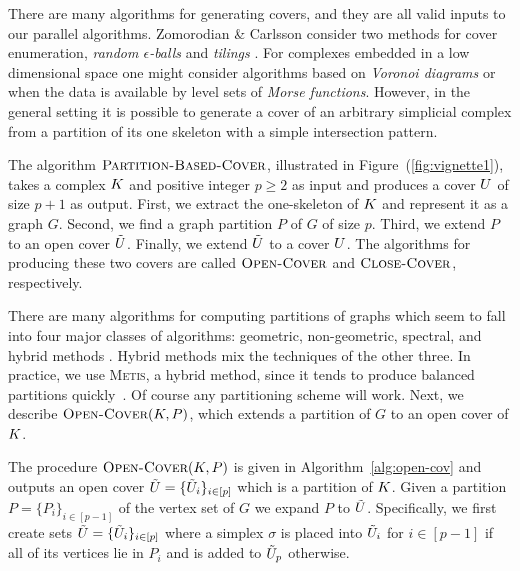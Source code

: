 \documentclass{elsarticle}
\begin{document}
There are many algorithms for generating covers, and they are all valid inputs to our parallel algorithms. 
Zomorodian \& Carlsson consider two methods for cover enumeration, \emph{random $\epsilon$-balls} 
and \emph{tilings} \cite{zc-lh-08}. For complexes embedded in a low dimensional space one might consider
algorithms based on \emph{Voronoi diagrams} or when the data is available by level sets of 
\emph{Morse functions}.  However, in the general setting it is possible to generate a cover of an 
arbitrary simplicial complex from a partition of its one skeleton with a simple intersection pattern.

The algorithm $\textnormal{\scshape Partition-Based-Cover}$, illustrated in Figure~(\ref{fig:vignette1}), takes a complex $K$ and positive 
integer $p \geq 2$ as input and produces a cover $U$ of size $p+1$ as output. 
First, we extract the one-skeleton of $K$ and represent it as a graph $G$. 
Second, we find a graph partition $P$ of $G$ of size $p$.  
Third, we extend $P$ to an open cover $\tilde{U}$. Finally, we extend $\tilde{U}$ to a cover $U$. The algorithms
for producing these two covers are called $\textnormal{\scshape Open-Cover}$ and
$\textnormal{\scshape Close-Cover}$, respectively. 

There are many algorithms for computing partitions of graphs which
seem to fall into four major classes of algorithms: geometric, non-geometric, 
spectral, and hybrid methods \cite{fj-gp-98}. Hybrid methods mix the techniques of the 
other three. In practice, we use \textsc{Metis}, a hybrid method, since it tends to produce balanced partitions quickly~\cite{KaKu95}. 
Of course any partitioning scheme will work. Next, we describe $\textnormal{\scshape Open-Cover}(K,P)$, which extends a partition of $G$ to an open cover of $K$. 

The procedure $\textnormal{\scshape Open-Cover}(K,P)$ is given in Algorithm~\ref{alg:open-cov} and outputs an open cover $\tilde{U} = \{\tilde{U}_i\}_{i \in [p]}$ which is a partition of $K$. Given a partition $P = \{P_i\}_{i \in [p-1]}$ of the vertex set of $G$ we expand $P$ to $\tilde{U}$. Specifically, we first create sets 
$\tilde{U} = \{\tilde{U}_i\}_{i \in [p]}$ where a simplex $\sigma$ is placed into $\tilde{U}_i$ for $i \in [p-1]$ 
if all of its vertices lie in $P_i$ and is added to $\tilde{U}_p$ otherwise. 
\end{document}
